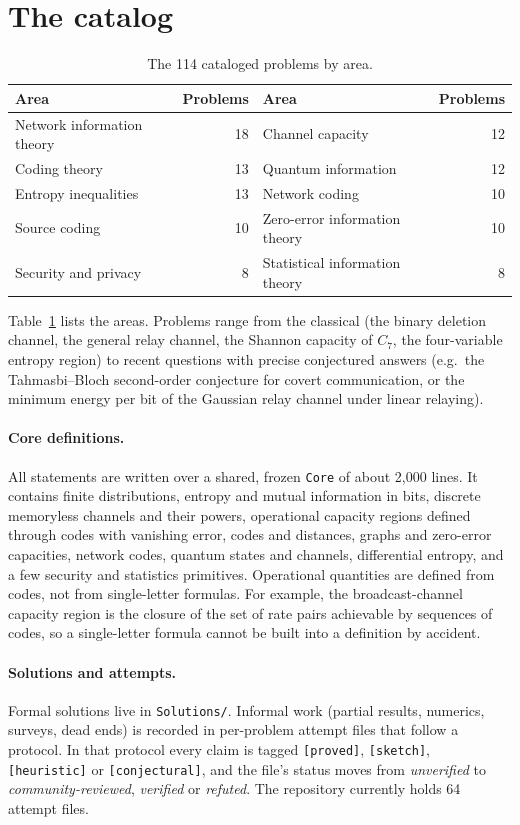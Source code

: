 \documentclass[11pt]{article}
\newcommand{\code}[1]{\texttt{#1}}
\begin{document}
\section{The catalog}\label{sec:catalog}

\begin{table}[t]
\centering
\begin{tabular}{lr@{\qquad}lr}
\toprule
Area & Problems & Area & Problems\\
\midrule
Network information theory & 18 & Channel capacity & 12\\
Coding theory & 13 & Quantum information & 12\\
Entropy inequalities & 13 & Network coding & 10\\
Source coding & 10 & Zero-error information theory & 10\\
Security and privacy & 8 & Statistical information theory & 8\\
\bottomrule
\end{tabular}
\caption{The 114 cataloged problems by area.}\label{tab:areas}
\end{table}

Table~\ref{tab:areas} lists the areas. Problems range from the classical (the binary deletion
channel, the general relay channel, the Shannon capacity of $C_7$, the four-variable entropy
region) to recent questions with precise conjectured answers (e.g.\ the Tahmasbi--Bloch
second-order conjecture for covert communication, or the minimum energy per bit of the Gaussian
relay channel under linear relaying).

\paragraph{Core definitions.}
All statements are written over a shared, frozen \code{Core} of about 2{,}000 lines. It contains
finite distributions, entropy and mutual information in bits, discrete memoryless channels and
their powers, operational capacity regions defined through codes with vanishing error, codes and
distances, graphs and zero-error capacities, network codes, quantum states and channels,
differential entropy, and a few security and statistics primitives. Operational quantities are
defined from codes, not from single-letter formulas. For example, the broadcast-channel capacity
region is the closure of the set of rate pairs achievable by sequences of codes, so a
single-letter formula cannot be built into a definition by accident.

\paragraph{Solutions and attempts.}
Formal solutions live in \code{Solutions/}. Informal work (partial results, numerics, surveys,
dead ends) is recorded in per-problem attempt files that follow a protocol. In that protocol
every claim is tagged \code{[proved]}, \code{[sketch]}, \code{[heuristic]} or
\code{[conjectural]}, and the file's status moves from \emph{unverified} to
\emph{community-reviewed}, \emph{verified} or \emph{refuted}. The repository currently holds 64
attempt files.
\end{document}
